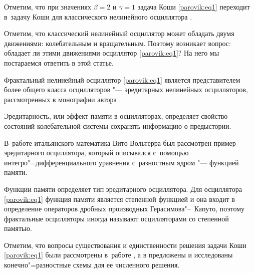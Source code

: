 Отметим, что при значениях $\beta  = 2$ и $\gamma  = 1$ задача Коши \eqref{parovik:eq1} переходит в~задачу Коши для классического нелинейного осциллятора \cite{parovik:17}.



\smallskip



\begin{remark}

Отметим, что классический нелинейный осциллятор может обладать двумя движениями: колебательным и вращательным. Поэтому возникает вопрос: обладает ли этими движениями осциллятор \eqref{parovik:eq1}?  На него мы постараемся ответить в этой статье.

\end{remark}



\smallskip



Фрактальный нелинейный осциллятор \eqref{parovik:eq1} является представителем более общего класса осцилляторов "--- эредитарных нелинейных осцилляторов, рассмотренных в монографии автора \cite{parovik:18}. 

Эредитарность, или эффект памяти в осцилляторах, определяет свойство состояний колебательной системы сохранять информацию о предыстории. 

В~работе итальянского математика Вито Вольтерра \cite{parovik:19} был рассмотрен пример эредитарного осциллятора, который описывался с~помощью интегро"=дифференциального уравнения с~разностным ядром "--- функцией памяти. 

Функции памяти определяет тип эредитарного осциллятора. Для осциллятора \eqref{parovik:eq1} функция памяти является степенной функцией и она входит в определение операторов дробных производных Герасимова"--~Капуто, поэтому фрактальные осцилляторы иногда называют осцилляторами со степенной памятью.





\smallskip



\begin{remark}

Отметим, что вопросы существования и единственности решения задачи Коши \eqref{parovik:eq1} были рассмотрены в~работе \cite{parovik:20}, а в \cite{parovik:18} предложены и исследованы конечно"=разностные схемы для ее численного решения.

\end{remark}



